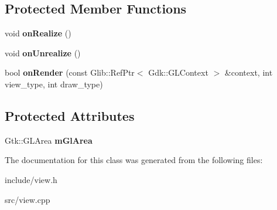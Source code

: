 \subsection*{Protected Member Functions}
\begin{DoxyCompactItemize}
\item 
\mbox{\label{classview_af8f3d7a120f81cdd3442f74a6ae4b179}} 
void {\bfseries on\+Realize} ()
\item 
\mbox{\label{classview_aafc9c59c4b73dfcab2ede5a6c3859ae1}} 
void {\bfseries on\+Unrealize} ()
\item 
\mbox{\label{classview_a08e8f288e3d34acb2e21a56e4409e81a}} 
bool {\bfseries on\+Render} (const Glib\+::\+Ref\+Ptr$<$ Gdk\+::\+G\+L\+Context $>$ \&context, int view\+\_\+type, int draw\+\_\+type)
\end{DoxyCompactItemize}
\subsection*{Protected Attributes}
\begin{DoxyCompactItemize}
\item 
\mbox{\label{classview_a96a3730358810fb35022cca21811a7f9}} 
Gtk\+::\+G\+L\+Area {\bfseries m\+Gl\+Area}
\end{DoxyCompactItemize}


The documentation for this class was generated from the following files\+:\begin{DoxyCompactItemize}
\item 
include/view.\+h\item 
src/view.\+cpp\end{DoxyCompactItemize}

